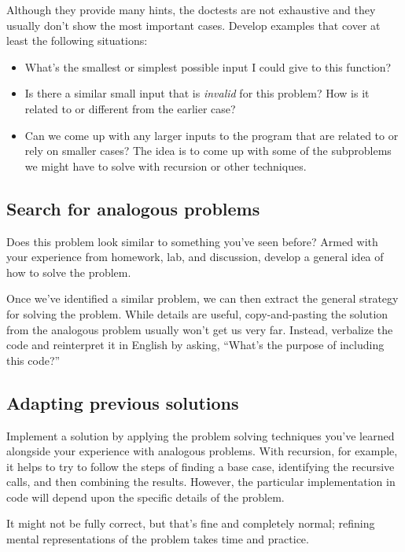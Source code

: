 Although they provide many hints, the doctests are not exhaustive and they
usually don't show the most important cases. Develop examples that cover at
least the following situations:

\begin{itemize}
\item What's the smallest or simplest possible input I could give to this
function?
\item Is there a similar small input that is \emph{invalid} for this problem?
How is it related to or different from the earlier case?
\item Can we come up with any larger inputs to the program that are related to
or rely on smaller cases? The idea is to come up with some of the subproblems
we might have to solve with recursion or other techniques.
\end{itemize}

\subsection*{Search for analogous problems}

Does this problem look similar to something you've seen before? Armed with your
experience from homework, lab, and discussion, develop a general idea of how to
solve the problem.

Once we've identified a similar problem, we can then extract the general
strategy for solving the problem. While details are useful, copy-and-pasting
the solution from the analogous problem usually won't get us very far. Instead,
verbalize the code and reinterpret it in English by asking, ``What's the
purpose of including this code?''

\subsection*{Adapting previous solutions}

Implement a solution by applying the problem solving techniques you've learned
alongside your experience with analogous problems. With recursion, for example,
it helps to try to follow the steps of finding a base case, identifying the
recursive calls, and then combining the results. However, the particular
implementation in code will depend upon the specific details of the problem.

It might not be fully correct, but that's fine and completely normal; refining
mental representations of the problem takes time and practice.

